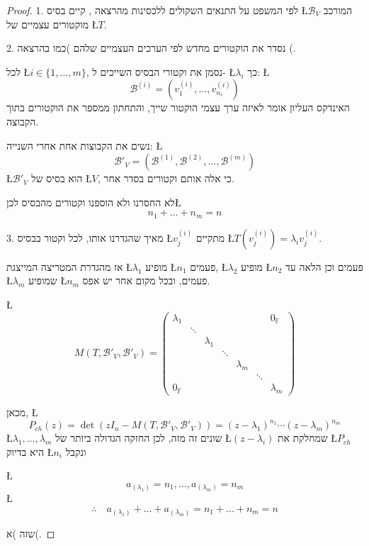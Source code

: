 \documentclass[english,hebrew]{article}
\begin{document}
\begin{proof}
1. לפי המשפט על התנאים השקולים ללכסינות מהרצאה {\endL}, קיים
בסיס \L{$\mathcal{B}_{V}$} המורכב מוקטורים עצמיים של \L{$T$}.

2. נסדר את הוקטורים מחדש לפי הערכים העצמיים שלהם )כמו בהרצאה {\endL}(.

לכל \L{$i\in\{1,\dots,m\}$}, נסמן את וקטורי הבסיס השייכים ל- \L{$\lambda_{i}$}
כך: \L{%
\[
\mathcal{B}^{(i)}=(v_{1}^{(i)},\dots,v_{n_{i}}^{(i)})
\]
}%
האינדקס העליון אומר לאיזה ערך עצמי הוקטור שייך, והתחתון ממספר את הוקטורים
בתוך הקבוצה. 

נשים את הקבוצות אחת אחרי השנייה: \L{%
\[
\mathcal{B}'_{V}=(\mathcal{B}^{(1)},\mathcal{B}^{(2)},\dots,\mathcal{B}^{(m)})
\]
}%
\L{$\mathcal{B}'_{V}$} הוא בסיס של \L{$V$}, כי אלה אותם וקטורים
בסדר אחר.

לא החסרנו ולא הוספנו וקטורים מהבסיס לכן\L{%
\[
n_{1}+\dots+n_{m}=n
\]
}%

3. מאיך שהגדרנו אותו, לכל וקטור בבסיס \L{$v_{j}^{(i)}$} מתקיים \L{$T\left(v_{j}^{(i)}\right)=\lambda_{i}v_{j}^{(i)}$}.

אז מהגדרת המטריצה המייצגת \L{$\lambda_{1}$} מופיע \L{$n_{1}$} פעמים,
\L{$\lambda_{2}$} מופיע \L{$n_{2}$} פעמים וכן הלאה עד \L{$\lambda_{m}$}
שמופיע \L{$n_{m}$} פעמים, ובכל מקום אחר יש אפס.

\L{%
\[
M(T,\mathcal{B}'_{V},\mathcal{B}'_{V})=\begin{pmatrix}\lambda_{1} &  &  &  &  &  & 0_{\mathbb{F}}\\
 & \ddots\\
 &  & \lambda_{1}\\
 &  &  & \ddots\\
 &  &  &  & \lambda_{m}\\
 &  &  &  &  & \ddots\\
0_{\mathbb{F}} &  &  &  &  &  & \lambda_{m}
\end{pmatrix}
\]
}%

מכאן, \L{%
\[
P_{ch}(z)=\det\left(zI_{n}-M(T,\mathcal{B}'_{V},\mathcal{B}'_{V})\right)=(z-\lambda_{1})^{n_{1}}\cdots(z-\lambda_{m})^{n_{m}}
\]
}%
\L{$\lambda_{1},\dots,\lambda_{m}$} שונים זה מזה, לכן החזקה הגדולה
ביותר של \L{$(z-\lambda_{i})$} שמחלקת את \L{$P_{ch}$} היא בדיוק
\L{$n_{i}$} ונקבל

\L{%
\[
a_{\left(\lambda_{1}\right)}=n_{1},\dots,a_{\left(\lambda_{m}\right)}=n_{m}
\]
}%
\L{%
\[
\therefore\quad a_{\left(\lambda_{1}\right)}+\dots+a_{\left(\lambda_{m}\right)}=n_{1}+\dots+n_{m}=n
\]
}%

שזה )א(.


\end{proof}
\end{document}
